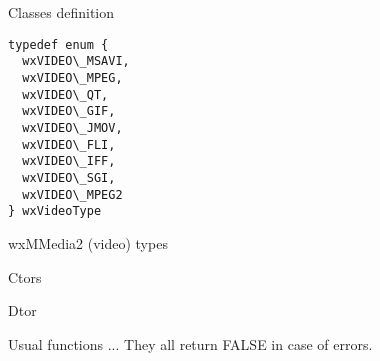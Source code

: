 %
%


\section{}\label{wxvideobasedriver}



Classes definition




{\small \begin{verbatim}
typedef enum {
  wxVIDEO\_MSAVI,
  wxVIDEO\_MPEG,
  wxVIDEO\_QT,
  wxVIDEO\_GIF,
  wxVIDEO\_JMOV,
  wxVIDEO\_FLI,
  wxVIDEO\_IFF,
  wxVIDEO\_SGI,
  wxVIDEO\_MPEG2
} wxVideoType
\end{verbatim}}

wxMMedia2 (video) types


\label{wxvideobasedriverwxvideobasedriver}


Ctors


\label{wxvideobasedriverwxvideobasedriver}



\label{wxvideobasedriverwxvideobasedriver}



\label{wxvideobasedriverdtor}


Dtor


\label{wxvideobasedriverplay}


Usual functions ... They all return FALSE in case of errors.


\label{wxvideobasedriverstop}



